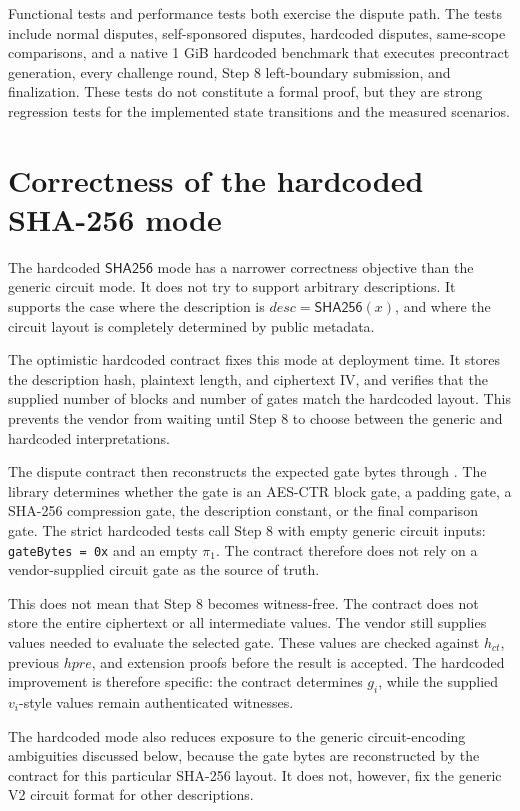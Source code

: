 Functional tests and performance tests both exercise the dispute path. The tests include
normal disputes, self-sponsored disputes, hardcoded disputes, same-scope comparisons, and a
native 1 GiB hardcoded benchmark that executes precontract generation, every challenge
round, Step 8 left-boundary submission, and finalization. These tests do not constitute a
formal proof, but they are strong regression tests for the implemented state transitions and
the measured scenarios.

\section{Correctness of the hardcoded SHA-256 mode}

The hardcoded \(\mathsf{SHA256}\) mode has a narrower correctness objective than the generic
circuit mode. It does not try to support arbitrary descriptions. It supports the case where
the description is \(desc=\mathsf{SHA256}(x)\), and where the circuit layout is completely
determined by public metadata.

The optimistic hardcoded contract fixes this mode at deployment time. It stores the
description hash, plaintext length, and ciphertext IV, and verifies that the supplied number
of blocks and number of gates match the hardcoded layout. This prevents the vendor from
waiting until Step 8 to choose between the generic and hardcoded interpretations.

The dispute contract then reconstructs the expected gate bytes through
. The library determines whether the gate is an AES-CTR
block gate, a padding gate, a SHA-256 compression gate, the description constant, or the
final comparison gate. The strict hardcoded tests call Step 8 with empty generic circuit
inputs: \texttt{gateBytes = 0x} and an empty \(\pi_1\). The contract therefore does not rely
on a vendor-supplied circuit gate as the source of truth.

This does not mean that Step 8 becomes witness-free. The contract does not store the entire
ciphertext or all intermediate values. The vendor still supplies values needed to evaluate
the selected gate. These values are checked against \(h_{\mathit{ct}}\), previous \(hpre\),
and extension proofs before the result is accepted. The hardcoded improvement is therefore
specific: the contract determines \(g_i\), while the supplied \(v_i\)-style values remain
authenticated witnesses.

The hardcoded mode also reduces exposure to the generic circuit-encoding ambiguities
discussed below, because the gate bytes are reconstructed by the contract for this
particular SHA-256 layout. It does not, however, fix the generic V2 circuit format for other
descriptions.

